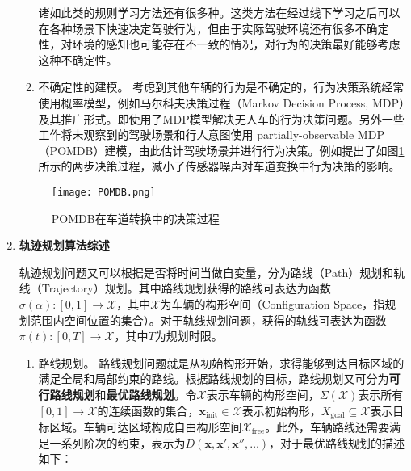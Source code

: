 \begin{enumerate}[wide=\parindent]
\begin{enumerate}[label=(\arabic*),wide=\parindent]
诸如此类的规则学习方法还有很多种。这类方法在经过线下学习之后可以在各种场景下快速决定驾驶行为，但由于实际驾驶环境还有很多不确定性，对环境的感知也可能存在不一致的情况，对行为的决策最好能够考虑这种不确定性。

\item 不确定性的建模。
考虑到其他车辆的行为是不确定的，行为决策系统经常使用概率模型，例如马尔科夫决策过程（Markov Decision Process, MDP）及其推广形式。\cite{Brechtel2011Probabilistic}即使用了MDP模型解决无人车的行为决策问题。另外一些工作将未观察到的驾驶场景和行人意图使用 partially-observable MDP （POMDB）建模，由此估计驾驶场景并进行行为决策。例如提出了如图\ref{fig:POMDB}所示的两步决策过程，减小了传感器噪声对车道变换中行为决策的影响。
\end{enumerate}

\begin{figure}[htbp]
\centering
\texttt{[image: POMDB.png]}
\caption[POMDB在车道转换中的决策过程]{POMDB在车道转换中的决策过程\cite{Ulbrich2013Probabilistic}}
\label{fig:POMDB}
\end{figure}

\item \textbf{轨迹规划算法综述}
\label{sec:trajectory}

轨迹规划问题又可以根据是否将时间当做自变量，分为路线（Path）规划和轨线（Trajectory）规划。其中路线规划获得的路线可表达为函数 $\sigma(\alpha): [0,1]\rightarrow \mathcal{X}$，其中$\mathcal{X}$为车辆的构形空间（Configuration Space，指规划范围内空间位置的集合）。对于轨线规划问题，获得的轨线可表达为函数 $\pi(t): [0, T]\rightarrow \mathcal{X}$，其中$T$为规划时限。

\begin{enumerate}[label=(\arabic*),wide=\parindent]
\item 路线规划。 路线规划问题就是从初始构形开始，求得能够到达目标区域的满足全局和局部约束的路线。根据路线规划的目标，路线规划又可分为\textbf{可行路线规划}和\textbf{最优路线规划}。令$\mathcal{X}$表示车辆的构形空间，$\Sigma(\mathcal{X})$表示所有$[0,1]\rightarrow \mathcal{X}$的连续函数的集合，$\mathbf{x}_{\mathrm{init}}\in \mathcal{X}$表示初始构形，$X_{\mathrm{goal}}\subseteq \mathcal{X}$表示目标区域。车辆可达区域构成自由构形空间$\mathcal{X}_{\mathrm{free}}$。此外，车辆路线还需要满足一系列阶次的约束，表示为$D(\mathbf{x},\mathbf{x}',\mathbf{x}'', \dots)$，对于最优路线规划的描述如下：


\end{enumerate}
\end{enumerate}
